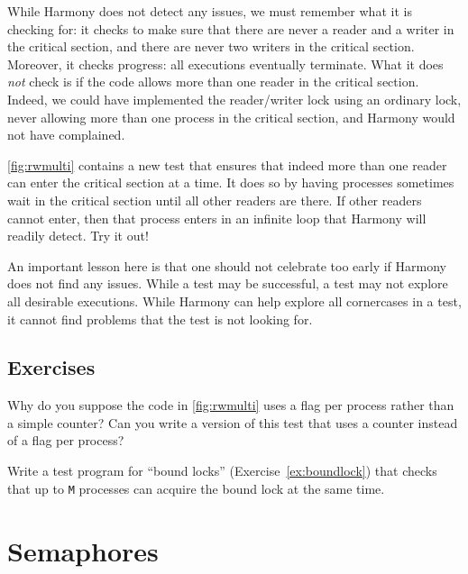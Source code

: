 \documentclass{report}
\begin{document}
While Harmony does not detect any issues, we must remember what it is checking
for: it checks to make sure that there are never a reader and a writer
in the critical section, and there are never two writers in the critical
section.  Moreover, it checks progress: all executions eventually terminate.
What it does \emph{not} check is if the code allows more than one reader
in the critical section.  Indeed, we could have implemented the reader/writer
lock using an ordinary lock, never allowing
more than one process in the critical section, and Harmony would not have
complained.

\autoref{fig:rwmulti} contains a new test that ensures that indeed more
than one reader can enter the critical section at a time.  It does so by
having processes sometimes wait in the critical section until all other readers
are there.  If other readers cannot enter, then that process enters in an
infinite loop that Harmony will readily detect.  Try it out!

An important lesson here is that one should not celebrate too early if Harmony
does not find any issues.  While a test may be successful, a test may not
explore all desirable executions.  While Harmony can help explore all cornercases
in a test, it cannot find problems that the test is not looking for.

\section*{Exercises}
\begin{problems}
\item Why do you suppose the code in \autoref{fig:rwmulti} uses a flag
per process rather than a simple counter?
Can you write a version of this test that uses a counter instead
of a flag per process?
\item Write a test program for ``bound locks'' (Exercise~\ref{ex:boundlock})
that checks that up to \texttt{M} processes
can acquire the bound lock at the same time.
\end{problems}

\chapter{Semaphores}
\label{ch:semaphore}
%

%
\end{document}
